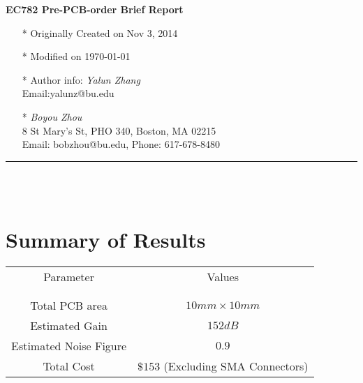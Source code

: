 \documentclass[]{article}
\begin{document}
\pagestyle{empty}
{\large\textbf{EC782 Pre-PCB-order Brief Report}}

\begin{multicols}{2}

    \begin{itemize}
        \item[*] Originally Created on Nov 3, 2014
        \item[*] Modified on \today
        \item[*] Author info: \textit{Yalun Zhang}\\ 
                 Email:yalunz@bu.edu
                    
    \end{itemize}

    \columnbreak

    \begin{itemize}
        \item[ ]
        \item[ ]
        \item[*] \textit {Boyou Zhou}\\
                 8 St Mary's St, PHO 340, Boston, MA 02215\\
                 Email: bobzhou@bu.edu, Phone: 617-678-8480
    \end{itemize}

\end{multicols}

\rule[-0.1cm]{7.5in}{0.01cm}\\
\\
\indent		             
\section {Summary of Results}

\begin{center}
    \begin{tabular}{c c}
        Parameter & Values \\ \\ \hline \\
        Total PCB area & $10mm \times 10mm$ \\
        Estimated Gain & $152dB$ \\
        Estimated Noise Figure & $0.9$ \\
        Total Cost & $\$153 $ (Excluding SMA Connectors)   \\
    \end{tabular}
\end{center}
\end{document}
